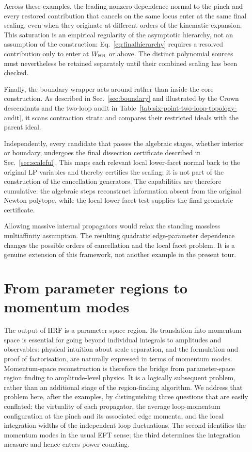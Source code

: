 \documentclass[a4paper,11pt]{article}
\newcommand{\WHR}{W_{\rm HR}}
\begin{document}
Across these examples, the leading nonzero dependence normal to the pinch and
every restored contribution that cancels on the same locus enter at the same
final scaling, even when they originate at different orders of the kinematic
expansion.  This saturation is an empirical regularity of the asymptotic
hierarchy, not an assumption of the construction:
Eq.~\eqref{eq:finalhierarchy} requires a resolved contribution only to enter at
\(\WHR\) or above.  The distinct polynomial sources must nevertheless be
retained separately until their combined scaling has been checked.

Finally, the boundary wrapper acts around rather than inside the core
construction.  As described in Sec.~\ref{sec:boundary} and illustrated by the
Crown descendants and the two-loop audit in
Table~\ref{tab:six-point-two-loop-topology-audit}, it scans contraction strata
and compares their restricted ideals with the parent ideal.

Independently, every candidate that passes the algebraic stages, whether
interior or boundary, undergoes the final dissection certificate described in
Sec.~\ref{sec:scaleful}.  This maps each relevant local lower-facet normal back
to the original LP variables and thereby certifies the scaling; it is not part
of the construction of the cancellation generators.  The capabilities are
therefore cumulative: the algebraic steps reconstruct information absent from
the original Newton polytope, while the local lower-facet test supplies the
final geometric certificate.

Allowing massive internal propagators would relax the standing massless
multiaffinity assumption.  The resulting quadratic edge-parameter dependence
changes the possible orders of cancellation and the local facet problem.  It is a
genuine extension of this framework, not another example in the present
tour.

\section{From parameter regions to momentum modes}
\label{sec:momentum-reconstruction}

The output of HRF is a parameter-space region.  Its translation into momentum
space is essential for going beyond individual integrals to amplitudes and
observables: physical intuition about scale separation, and the formulation
and proof of factorisation, are naturally expressed in terms of momentum
modes.  Momentum-space reconstruction is therefore the bridge from
parameter-space region finding to amplitude-level physics.  It is a logically
subsequent problem, rather than an additional stage of the region-finding
algorithm.  We address that problem here, after the examples, by distinguishing
three questions that are easily conflated: the virtuality of each propagator,
the average loop-momentum configuration at the pinch and its associated edge
momenta, and the local integration widths of the independent loop fluctuations.
The second identifies the momentum modes in the usual EFT sense; the third
determines the integration measure
and hence enters power counting.
\end{document}

